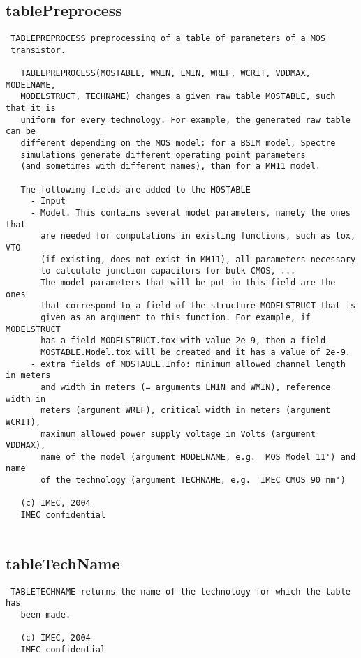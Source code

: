 \newpage
\subsection{tablePreprocess}
\label{sec:tablePreprocess}
\begin{verbatim}
 TABLEPREPROCESS preprocessing of a table of parameters of a MOS
 transistor.
 
   TABLEPREPROCESS(MOSTABLE, WMIN, LMIN, WREF, WCRIT, VDDMAX, MODELNAME,
   MODELSTRUCT, TECHNAME) changes a given raw table MOSTABLE, such that it is
   uniform for every technology. For example, the generated raw table can be 
   different depending on the MOS model: for a BSIM model, Spectre
   simulations generate different operating point parameters 
   (and sometimes with different names), than for a MM11 model.
   
   The following fields are added to the MOSTABLE
     - Input
     - Model. This contains several model parameters, namely the ones that 
       are needed for computations in existing functions, such as tox, VTO
       (if existing, does not exist in MM11), all parameters necessary
       to calculate junction capacitors for bulk CMOS, ...
       The model parameters that will be put in this field are the ones
       that correspond to a field of the structure MODELSTRUCT that is
       given as an argument to this function. For example, if MODELSTRUCT
       has a field MODELSTRUCT.tox with value 2e-9, then a field 
       MOSTABLE.Model.tox will be created and it has a value of 2e-9.
     - extra fields of MOSTABLE.Info: minimum allowed channel length in meters 
       and width in meters (= arguments LMIN and WMIN), reference width in
       meters (argument WREF), critical width in meters (argument WCRIT), 
       maximum allowed power supply voltage in Volts (argument VDDMAX),
       name of the model (argument MODELNAME, e.g. 'MOS Model 11') and name
       of the technology (argument TECHNAME, e.g. 'IMEC CMOS 90 nm')
 
   (c) IMEC, 2004
   IMEC confidential 
 

\end{verbatim}

\newpage
\subsection{tableTechName}
\label{sec:tableTechName}
\begin{verbatim}
 TABLETECHNAME returns the name of the technology for which the table has
   been made.
 
   (c) IMEC, 2004
   IMEC confidential 
 

\end{verbatim}

